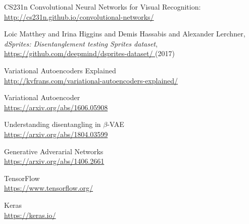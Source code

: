 \begin{thebibliography}{9}

CS231n Convolutional Neural Networks for Visual Recognition:\\
\url{http://cs231n.github.io/convolutional-networks/}

{Loic Matthey and Irina Higgins and Demis Hassabis and Alexander Lerchner},
\textit{dSprites: Disentanglement testing Sprites dataset},\\
\url{https://github.com/deepmind/dsprites-dataset/
} (2017)

Variational Autoencoders Explained\\
\url{http://kvfrans.com/variational-autoencoders-explained/}

Variational Autoencoder\\
\url{https://arxiv.org/abs/1606.05908}

Understanding disentangling in $\beta$-VAE\\
\url{https://arxiv.org/abs/1804.03599}

Generative Adverarial Networks\\
\url{https://arxiv.org/abs/1406.2661}

TensorFlow\\
\url{https://www.tensorflow.org/}

Keras\\
\url{https://keras.io/}

\end{thebibliography}

%
